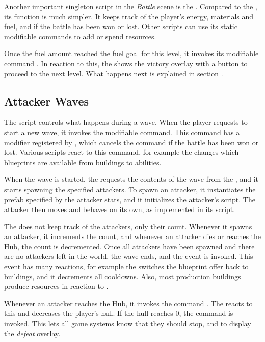 Another important singleton script in the \emph{Battle} scene is the .
Compared to the , its function is much simpler.
It keeps track of the player's energy, materials and fuel, and if the battle has been won or lost.
Other scripts can use its static modifiable commands to add or spend resources.

Once the fuel amount reached the fuel goal for this level, it invokes its modifiable command .
In reaction to this, the  shows the victory overlay with a button to proceed to the next level.
What happens next is explained in section .

\subsection{Attacker Waves}\label{sec:docs-waves}

The  script controls what happens during a wave.
When the player requests to start a new wave, it invokes the  modifiable command.
This command has a modifier registered by , which cancels the command if the battle has been won or lost.
Various scripts react to this command, for example the  changes which blueprints are available from buildings to abilities.

When the wave is started, the  requests the contents of the wave from the , and it starts spawning the specified attackers.
To spawn an attacker, it instantiates the prefab specified by the attacker stats, and it initializes the attacker's  script.
The attacker then moves and behaves on its own, as implemented in its  script.

The  does not keep track of the attackers, only their count.
Whenever it spawns an attacker, it increments the count, and whenever an attacker dies or reaches the Hub, the count is decremented.
Once all attackers have been spawned and there are no attackers left in the world, the wave ends, and the  event is invoked.
This event has many reactions, for example the  switches the blueprint offer back to buildings, and it decrements all cooldowns.
Also, most production buildings produce resources in reaction to .

Whenever an attacker reaches the Hub, it invokes the command .
The  reacts to this and decreases the player's hull.
If the hull reaches 0, the command  is invoked.
This lets all game systems know that they should stop, and to display the \emph{defeat} overlay.


